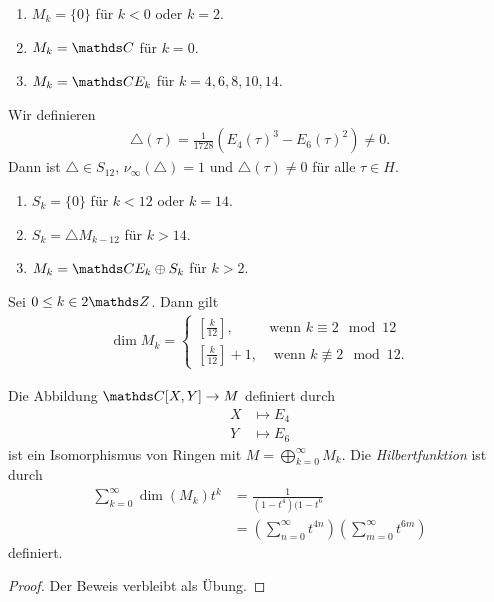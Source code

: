 \begin{prop}
\begin{enumerate}[label=(\roman*)]
\item $M_k=\{0\}$ für $k<0$ oder $k=2$.
\item $M_k=\C$ für $k=0$.
\item $M_k=\C E_k$ für $k=4,6,8,10,14$.
\end{enumerate}
\end{prop}

\begin{defi}
Wir definieren
\begin{align*}
\bigtriangleup(\tau)=\frac{1}{1728} (E_4(\tau)^3-E_6(\tau)^2)\not =0.
\end{align*}
Dann ist $\bigtriangleup\in S_{12}$, $\nu_\infty(\bigtriangleup)=1$ und $\bigtriangleup(\tau)\not=0$ für alle $\tau \in H$.
\end{defi}

\begin{prop}
\begin{enumerate}[label=(\roman*)]
\item $S_k=\{0\}$ für $k<12$ oder $k=14$.
\item $S_k=\bigtriangleup M_{k-12}$ für $k>14$.
\item $M_k=\C E_k\oplus S_k$ für $k>2$.
\end{enumerate}
\end{prop}

\begin{prop}
Sei $0\leq k\in 2\Z$. Dann gilt
\begin{align*}
\dim M_k=\begin{cases}
\left[\frac{k}{12}\right],~~&\text{wenn } k \equiv 2 \mod 12\\
\left[\frac{k}{12}\right]+1,&\text{ wenn } k \not \equiv 2 \mod 12.
\end{cases}
\end{align*}
\end{prop}

\begin{thm}
Die Abbildung $\C[X,Y]\to M$ definiert durch
\begin{align*}
X &\mapsto E_4\\
Y &\mapsto E_6
\end{align*}
ist ein Isomorphismus von Ringen mit $M =\bigoplus_{k=0}^\infty M_k$.
Die \emph{Hilbertfunktion} ist durch
\begin{align*}
\sum_{k=0}^\infty \dim(M_k)t^k&=\frac{1}{(1-t^4)(1-t^6}\\
&=\left(\sum_{n=0}^\infty t^{4n}\right) \left(\sum_{m=0}^\infty t^{6m}\right)
\end{align*}
definiert.
\end{thm}
\begin{proof}
Der Beweis verbleibt als Übung.
\end{proof}
